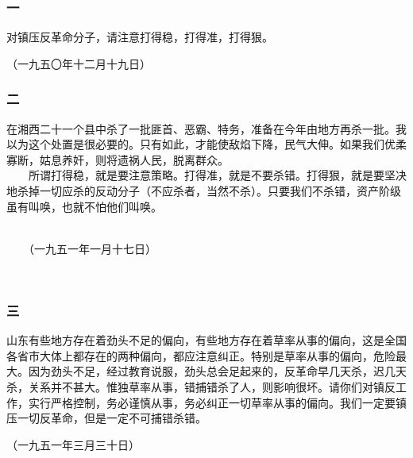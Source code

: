 \documentclass[cn,11pt,chinese]{elegantbook}
\def\myformat#1{\hfil\hfil #1}
\begin{document}
\subsubsection*{\myformat{一}}
对镇压反革命分子，请注意打得稳，打得准，打得狠。\\
\begin{flushright}
（一九五〇年十二月十九日）
\end{flushright}
\subsubsection*{\myformat{二}}
在湘西二十一个县中杀了一批匪首、恶霸、特务，准备在今年由地方再杀一批。我以为这个处置是很必要的。只有如此，才能使敌焰下降，民气大伸。如果我们优柔寡断，姑息养奸，则将遗祸人民，脱离群众。\\
　　所谓打得稳，就是要注意策略。打得准，就是不要杀错。打得狠，就是要坚决地杀掉一切应杀的反动分子（不应杀者，当然不杀）。只要我们不杀错，资产阶级虽有叫唤，也就不怕他们叫唤。\\
　　\begin{flushright}
　　（一九五一年一月十七日）
　　\end{flushright}
　　
\subsubsection*{\myformat{三}}
山东有些地方存在着劲头不足的偏向，有些地方存在着草率从事的偏向，这是全国各省市大体上都存在的两种偏向，都应注意纠正。特别是草率从事的偏向，危险最大。因为劲头不足，经过教育说服，劲头总会足起来的，反革命早几天杀，迟几天杀，关系并不甚大。惟独草率从事，错捕错杀了人，则影响很坏。请你们对镇反工作，实行严格控制，务必谨慎从事，务必纠正一切草率从事的偏向。我们一定要镇压一切反革命，但是一定不可捕错杀错。\\
\begin{flushright}
（一九五一年三月三十日）
\end{flushright}
\end{document}
